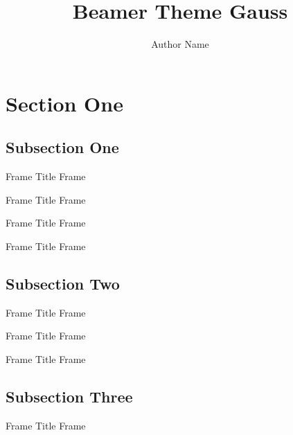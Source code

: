 \documentclass[14pt,xcolor={rgb}]{beamer}
\begin{document}
\title{Beamer Theme Gauss}
\author{Author Name}

\begin{frame}[plain]
\titlepage
\end{frame}

\section{Section One}

\subsection{Subsection One}

\begin{frame}{Frame Title}
Frame \insertframenumber
\end{frame}

\begin{frame}{Frame Title}
Frame \insertframenumber
\end{frame}

\begin{frame}{Frame Title}
Frame \insertframenumber
\end{frame}

\begin{frame}{Frame Title}
Frame \insertframenumber
\end{frame}

\subsection{Subsection Two}

\begin{frame}{Frame Title}
Frame \insertframenumber
\end{frame}

\begin{frame}{Frame Title}
Frame \insertframenumber
\end{frame}

\begin{frame}{Frame Title}
Frame \insertframenumber
\end{frame}

\subsection{Subsection Three}

\begin{frame}{Frame Title}
Frame \insertframenumber
\end{frame}
\end{document}
